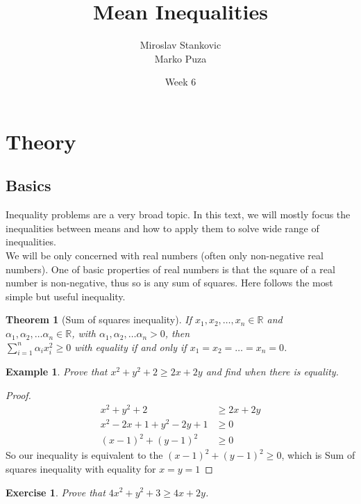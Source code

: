 \documentclass[11pt,a5paper]{article}
\title{\textbf{Mean Inequalities}}
\date{Week 6}
\author{Miroslav Stankovic\\ Marko Puza}
\newtheorem{theorem}{Example}
\newtheorem{exercise}{Exercise}
\newtheorem*{Theorem}{Theorem}
\begin{document}
\maketitle

\section{Theory}
\subsection*{Basics}

Inequality problems are a very broad topic. In this text, we will 
mostly focus the inequalities between means and how to apply them 
to solve wide range of inequalities. \\

\noindent We will be only concerned with real numbers (often only 
non-negative real numbers). One of basic properties of real numbers 
is that the square of a real number is non-negative, thus so is any sum 
of squares. Here follows the most simple but useful inequality.

\begin{Theorem}[Sum of squares inequality]
	If $x_1, x_2, \dots, x_n \in \mathbb{R}$ and \\
	$\alpha_1, \alpha_2, \dots \alpha_n  \in \mathbb{R}$,
    with $\alpha_1, \alpha_2, \dots \alpha_n > 0$, then \\
	$\sum_{i=1}^n \alpha_i x_i^2 \ge 0$ with equality if and only if 
	$x_1 = x_2 = \dots = x_n = 0$.
\end{Theorem}

\begin{theorem} Prove that $x^2 + y^2 + 2 \ge 2x + 2y$ and find when 
there is equality.
\end{theorem}
\begin{proof} 
	\begin{align*} 
		x^2 + y^2 + 2 & \ge 2x + 2y \\
		x^2 -2x +1 + y^2 -2y + 1 & \ge 0 \\
		(x-1)^2 + (y-1)^2 & \ge 0
	\end{align*}
	So our inequality is equivalent to the $(x-1)^2 + (y-1)^2 \ge 0$, 
	which is Sum of squares inequality with equality for $x=y=1$
\end{proof}
\begin{exercise} Prove that $4x^2 + y^2 + 3 \ge 4x + 2y$.
\end{exercise}
\end{document}
